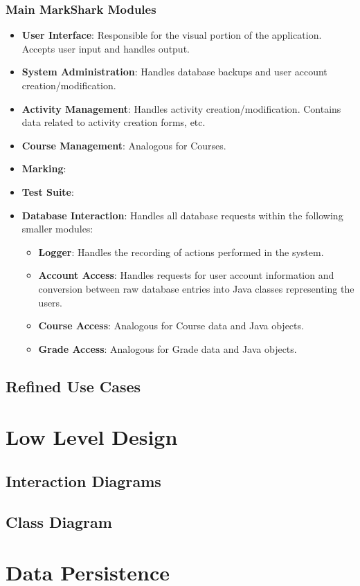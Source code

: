 \documentclass{article}
\begin{document}
\subsubsection{Main MarkShark Modules}
\begin{itemize}
  \item \textbf{User Interface}: Responsible for the visual portion of the
    application. Accepts user input and handles output.
  \item \textbf{System Administration}: Handles database backups and user
    account creation/modification.
  \item \textbf{Activity Management}: Handles activity creation/modification.
    Contains data related to activity creation forms, etc.
  \item \textbf{Course Management}: Analogous for Courses.
  \item \textbf{Marking}: 
  \item \textbf{Test Suite}:
  \item \textbf{Database Interaction}: Handles all database requests within the
    following smaller modules:
    \begin{itemize}
      \item \textbf{Logger}: Handles the recording of actions performed in the
        system. 
      \item \textbf{Account Access}: Handles requests for user account information
        and conversion between raw database entries into Java classes representing
        the users.
      \item \textbf{Course Access}: Analogous for Course data and Java objects.
      \item \textbf{Grade Access}: Analogous for Grade data and Java objects.
    \end{itemize}
\end{itemize}

\subsection{Refined Use Cases}

\section{Low Level Design}
\subsection{Interaction Diagrams}
\subsection{Class Diagram}

\section{Data Persistence}
\end{document}
